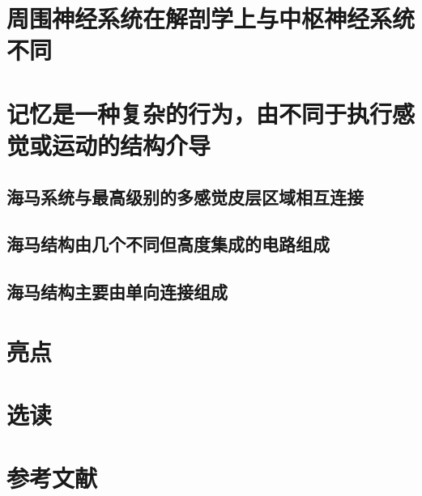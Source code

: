 \section{周围神经系统在解剖学上与中枢神经系统不同}

\section{记忆是一种复杂的行为，由不同于执行感觉或运动的结构介导}
\subsection{海马系统与最高级别的多感觉皮层区域相互连接}
\subsection{海马结构由几个不同但高度集成的电路组成}
\subsection{海马结构主要由单向连接组成}


\section{亮点}
\section{选读}
\section{参考文献}























